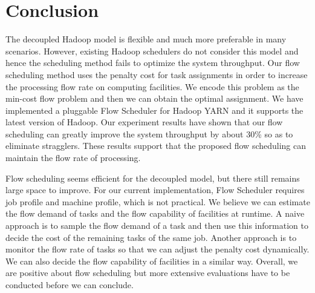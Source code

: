 \section{Conclusion}
\label{sec:conclusion}

The decoupled Hadoop model is flexible and much more preferable in many scenarios.
However, existing Hadoop schedulers do not consider this model and hence the scheduling method fails to optimize the system throughput.
Our flow scheduling method uses the penalty cost for task assignments in order to increase the processing flow rate on computing facilities.
We encode this problem as the min-cost flow problem and then we can obtain the optimal assignment.
We have implemented a pluggable Flow Scheduler for Hadoop YARN and it supports the latest version of Hadoop.
Our experiment results have shown that our flow scheduling can greatly improve the system throughput by about 30\% so as to eliminate stragglers.
These results support that the proposed flow scheduling can maintain the flow rate of processing.

Flow scheduling seems efficient for the decoupled model, but there still remains large space to improve.
For our current implementation, Flow Scheduler requires job profile and machine profile, which is not practical.
We believe we can estimate the flow demand of tasks and the flow capability of facilities at runtime.
A naive approach is to sample the flow demand of a task and then use this information to decide the cost of the remaining tasks of the same job.
Another approach is to monitor the flow rate of tasks so that we can adjust the penalty cost dynamically.
We can also decide the flow capability of facilities in a similar way.
Overall, we are positive about flow scheduling but more extensive evaluations have to be conducted before we can conclude.